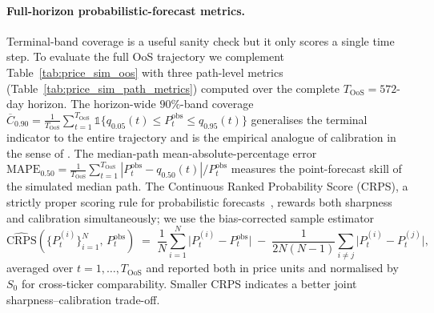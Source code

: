 \paragraph{Full-horizon probabilistic-forecast metrics.}
Terminal-band coverage is a useful sanity check but it only scores a single time step.
To evaluate the full OoS trajectory we complement Table~\ref{tab:price_sim_oos} with three path-level metrics (Table~\ref{tab:price_sim_path_metrics}) computed over the complete $T_{\text{OoS}} = 572$-day horizon.
The horizon-wide $90\%$-band coverage $\overline{C}_{0.90} = \tfrac{1}{T_{\text{OoS}}} \sum_{t=1}^{T_{\text{OoS}}} \mathbb{1}\{q_{0.05}(t) \le P^{\text{obs}}_t \le q_{0.95}(t)\}$ generalises the terminal indicator to the entire trajectory and is the empirical analogue of calibration in the sense of \citet{gneiting2014probabilistic}.
The median-path mean-absolute-percentage error $\text{MAPE}_{0.50} = \tfrac{1}{T_{\text{OoS}}} \sum_{t=1}^{T_{\text{OoS}}} |P^{\text{obs}}_t - q_{0.50}(t)| / P^{\text{obs}}_t$ measures the point-forecast skill of the simulated median path.
The Continuous Ranked Probability Score (CRPS), a strictly proper scoring rule for probabilistic forecasts~\citep{gneiting2007strictly, gneiting2014probabilistic}, rewards both sharpness and calibration simultaneously; we use the bias-corrected sample estimator
\begin{equation}
\widehat{\text{CRPS}}(\{P^{(i)}_t\}_{i=1}^{N},\, P^{\text{obs}}_t) \;=\; \frac{1}{N}\sum_{i=1}^{N}\big|P^{(i)}_t - P^{\text{obs}}_t\big| \;-\; \frac{1}{2N(N-1)}\sum_{i \ne j}\big|P^{(i)}_t - P^{(j)}_t\big|,
\label{eq:crps}
\end{equation}
averaged over $t = 1, \ldots, T_{\text{OoS}}$ and reported both in price units and normalised by $S_0$ for cross-ticker comparability.
Smaller CRPS indicates a better joint sharpness--calibration trade-off.

